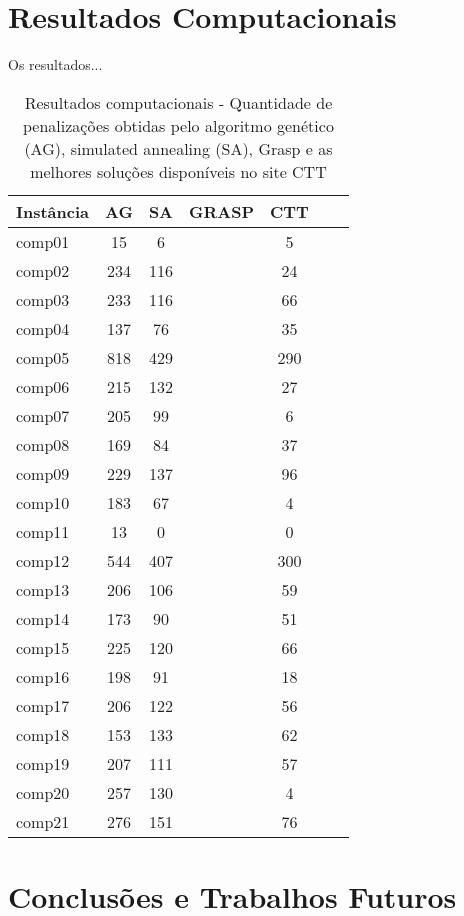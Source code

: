 \documentclass[11pt]{article}
\begin{document}
\section{Resultados Computacionais}
\label{sec:resultados}

Os resultados...

\begin{table}

\centering
\begin{tabular}{|l|c|c|c|c|c|c|} 
\hline

Instância & AG & SA & GRASP & CTT &  \\ \hline

comp01 & 15 & 6 & & 5 & \\
comp02 & 234 & 116 & & 24 & \\
comp03 & 233 & 116 &  & 66 & \\
comp04 & 137 & 76 & & 35 & \\
comp05 & 818 & 429 & & 290 & \\
comp06 & 215 & 132 & & 27 & \\
comp07 & 205 & 99 & & 6 & \\
comp08 & 169 & 84 & & 37 & \\
comp09 & 229 & 137 & & 96 & \\
comp10 & 183 & 67 & & 4 & \\
comp11 & 13 & 0 & & 0 & \\
comp12 & 544 & 407 & & 300 & \\
comp13 & 206 & 106 & & 59 & \\
comp14 & 173 & 90 & & 51 & \\
comp15 & 225 & 120 & & 66 & \\
comp16 & 198 & 91 & & 18 & \\
comp17 & 206 & 122 & & 56 & \\
comp18 & 153 & 133 & & 62 & \\
comp19 & 207 & 111 & & 57 & \\
comp20 & 257 & 130 & & 4 & \\
comp21 & 276 & 151 & & 76 & \\

\hline
\end{tabular}
\caption{Resultados computacionais - Quantidade de penalizações obtidas pelo algoritmo genético (AG), simulated annealing (SA), Grasp e as melhores soluções disponíveis no site CTT}
\label{tabResultados}
\end{table} 


\section{Conclusões e Trabalhos Futuros}
\label{sec:conclusao}
\end{document}

